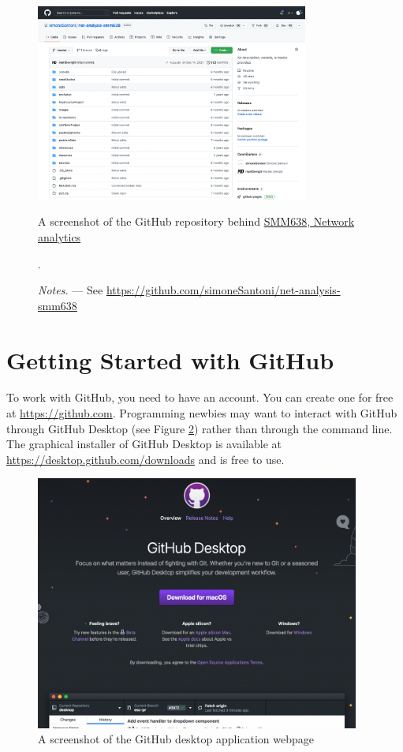 \documentclass[a4paper,11pt]{book}
\begin{document}
\begin{appendices}
\begin{figure}
\centering
\includegraphics[width=0.8\textwidth]{github_repo.png}
\caption{A screenshot of the GitHub repository behind \href{https://github.com/simoneSantoni/net-analysis-smm638}{SMM638, Network analytics}}
\caption*{\textit{Notes.} --- See \url{https://github.com/simoneSantoni/net-analysis-smm638}}.
\label{fig:github_repo}
\end{figure}
\clearpage

\section{Getting Started with GitHub}

To work with GitHub, you need to have an account. You can create one for free at \url{https://github.com}. Programming newbies may want to interact with GitHub through GitHub Desktop (see Figure \ref{fig:github_desktop}) rather than through the command line. The graphical installer of GitHub Desktop is available at \url{https://desktop.github.com/downloads} and is free to use.

\begin{figure}[!htbp]
	\centerin
	\includegraphics[width=0.95\textwidth]{github_desktop}
	\caption{A screenshot of the GitHub desktop application webpage}
	\label{fig:github_desktop}
\end{figure}


\end{appendices}
\end{document}
